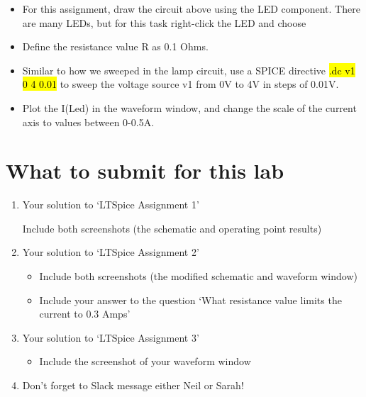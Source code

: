 \documentclass{article}
\begin{document}
\begin{itemize}
  \item For this assignment, draw the circuit above using the LED component.
    There are many LEDs, but for this task right-click the LED and choose
  \item Define the resistance value R as 0.1 Ohms.
  \item Similar to how we sweeped in the lamp circuit, use a SPICE directive
    \hl{.dc v1 0 4 0.01} to sweep the voltage source v1 from 0V to 4V in steps of 0.01V.
  \item Plot the I(Led) in the waveform window, and change the scale of the current axis to values between 0-0.5A.
\end{itemize}



\section*{What to submit for this lab}

\begin{enumerate}
  \item Your solution to `LTSpice Assignment 1'
    \begin{itemize}
      Include both screenshots (the schematic and operating point results)
    \end{itemize}
  \item Your solution to `LTSpice Assignment 2'
    \begin{itemize}
      \item Include both screenshots (the modified schematic and waveform
        window)
      \item Include your answer to the question `What resistance value limits
        the current to 0.3 Amps'

    \end{itemize}
  \item Your solution to `LTSpice Assignment 3'
    \begin{itemize}
      \item Include the screenshot of your waveform window
    \end{itemize}
  \item Don't forget to Slack message either Neil or Sarah!
\end{enumerate}

 
\end{document}
